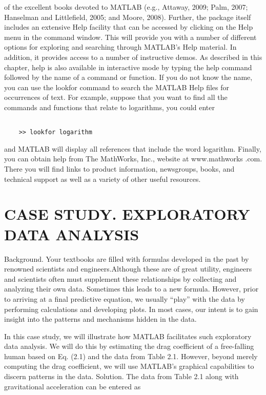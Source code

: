 \documentclass[../main.tex]{subfiles}
\begin{document}
of the excellent books devoted to MATLAB (e.g., Attaway, 2009; Palm, 2007; Hanselman
and Littlefield, 2005; and Moore, 2008).
Further, the package itself includes an extensive Help facility that can be accessed by
clicking on the Help menu in the command window. This will provide you with a number
of different options for exploring and searching through MATLAB's Help material. In addition, it provides access to a number of instructive demos.
As described in this chapter, help is also available in interactive mode by typing the
help command followed by the name of a command or function.
If you do not know the name, you can use the lookfor command to search the
MATLAB Help files for occurrences of text. For example, suppose that you want to find all
the commands and functions that relate to logarithms, you could enter
\begin{lstlisting}[frame=none, numbers=none]

	>> lookfor logarithm

\end{lstlisting}
and MATLAB will display all references that include the word logarithm.
Finally, you can obtain help from The MathWorks, Inc., website at www.mathworks
.com. There you will find links to product information, newsgroups, books, and technical
support as well as a variety of other useful resources.

\section{CASE STUDY. EXPLORATORY DATA ANALYSIS}


Background. Your textbooks are filled with formulas developed in the past by
renowned scientists and engineers.Although these are of great utility, engineers and scientists
often must supplement these relationships by collecting and analyzing their own data. Sometimes this leads to a new 
formula. However, prior to arriving at a final predictive equation, we
usually “play” with the data by performing calculations and developing plots. In most cases,
our intent is to gain insight into the patterns and mechanisms hidden in the data.


In this case study, we will illustrate how MATLAB facilitates such exploratory data
analysis. We will do this by estimating the drag coefficient of a free-falling human based on
Eq. (2.1) and the data from Table 2.1. However, beyond merely computing the drag
coefficient, we will use MATLAB's graphical capabilities to discern patterns in the data.
Solution. The data from Table 2.1 along with gravitational acceleration can be entered as
\end{document}
